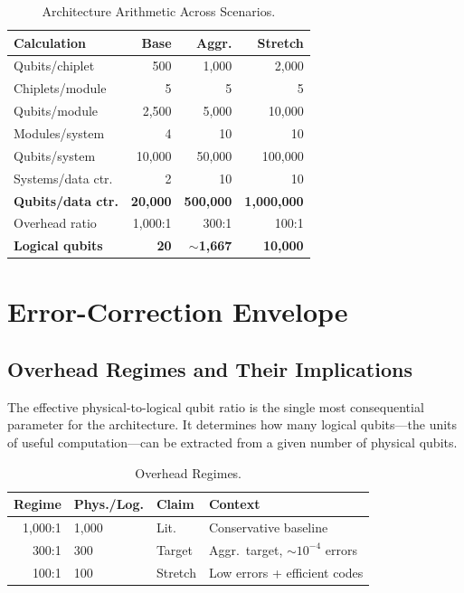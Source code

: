 \documentclass[conference]{IEEEtran}
\begin{document}
\begin{table}[htbp]
\centering
\caption{Architecture Arithmetic Across Scenarios.}
\label{tab:arithmetic}
\begin{tabular}{lrrr}
\toprule
\textbf{Calculation} & \textbf{Base} & \textbf{Aggr.} & \textbf{Stretch} \\
\midrule
Qubits/chiplet & 500 & 1,000 & 2,000 \\
Chiplets/module & 5 & 5 & 5 \\
Qubits/module & 2,500 & 5,000 & 10,000 \\
Modules/system & 4 & 10 & 10 \\
Qubits/system & 10,000 & 50,000 & 100,000 \\
Systems/data ctr. & 2 & 10 & 10 \\
\textbf{Qubits/data ctr.} & \textbf{20,000} & \textbf{500,000} & \textbf{1,000,000} \\
Overhead ratio & 1,000:1 & 300:1 & 100:1 \\
\textbf{Logical qubits} & \textbf{20} & \textbf{${\sim}$1,667} & \textbf{10,000} \\
\bottomrule
\end{tabular}
\end{table}

\section{Error-Correction Envelope}

\subsection{Overhead Regimes and Their Implications}

The effective physical-to-logical qubit ratio is the single most consequential parameter for the architecture. It determines how many logical qubits---the units of useful computation---can be extracted from a given number of physical qubits.

\begin{table}[htbp]
\centering
\caption{Overhead Regimes.}
\label{tab:overhead}
\begin{tabular}{rllp{2cm}}
\toprule
\textbf{Regime} & \textbf{Phys./Log.} & \textbf{Claim} & \textbf{Context} \\
\midrule
1,000:1 & 1,000 & Lit.\ & Conservative baseline~\cite{fowler2012, chamberland2022} \\
300:1 & 300 & Target & Aggr.\ target, ${\sim}10^{-4}$ errors \\
100:1 & 100 & Stretch & Low errors + efficient codes \\
\bottomrule
\end{tabular}
\end{table}
\end{document}

